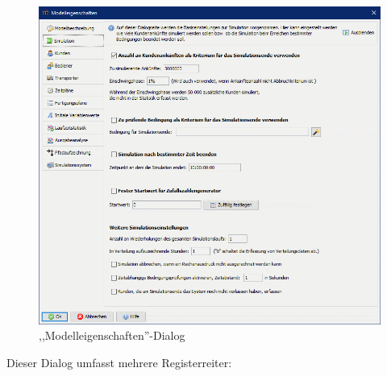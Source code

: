 \documentclass[deutsch]{svmono}
\begin{document}
\begin{figure}[H]	
	\caption{,,Modelleigenschaften''-Dialog}
	\centerline{\includegraphics[width=14cm]{DialogModel.png}}
	\label{fig:DialogModel}
\end{figure} 

Dieser Dialog umfasst mehrere Registerreiter:
\end{document}
